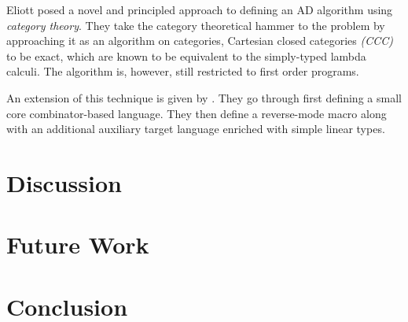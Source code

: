 \documentclass[11pt, final]{article}
\begin{document}
  Eliott posed a novel and principled approach to defining an AD algorithm using \textit{category theory}\cite{Elliott-2018-ad-icfp}.
  They take the category theoretical hammer to the problem by approaching it as an algorithm on categories, Cartesian closed categories \textit{(CCC)} to be exact, which are known to be equivalent to the simply-typed lambda calculi\cite{Elliott-2017-compiling-to-categories}\cite{10.1007/3-540-15198-2_10}.
  The algorithm is, however, still restricted to first order programs.

  An extension of this technique is given by \Vakar{}\cite{vkr2020reverse}.
  They go through first defining a small core combinator-based language.
  They then define a reverse-mode macro along with an additional auxiliary target language enriched with simple linear types.
  
  
  
\section{Discussion}
  
\section{Future Work}
  
\section{Conclusion}
  

\clearpage
\printbibliography
\makeatother
\end{document}
